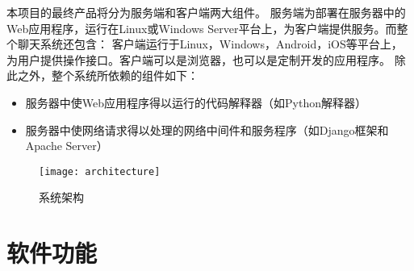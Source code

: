 




    

本项目的最终产品将分为服务端和客户端两大组件。
服务端为部署在服务器中的Web应用程序，运行在Linux或Windows Server平台上，为客户端提供服务。而整个聊天系统还包含：
客户端运行于Linux，Windows，Android，iOS等平台上，为用户提供操作接口。客户端可以是浏览器，也可以是定制开发的应用程序。
除此之外，整个系统所依赖的组件如下：
\begin{itemize}
	\item 服务器中使Web应用程序得以运行的代码解释器（如Python解释器）
	\item 服务器中使网络请求得以处理的网络中间件和服务程序（如Django框架和Apache Server）
\end{itemize}

\begin{figure}[h]
\centering
\texttt{[image: architecture]}
\caption{系统架构} \label{fig:architecture}
\end{figure}

\section{软件功能}

